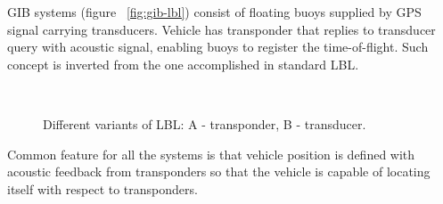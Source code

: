 GIB systems (figure ~\ref{fig:gib-lbl}) consist of floating buoys supplied by GPS signal carrying transducers. Vehicle has transponder that replies to transducer query with acoustic signal, enabling buoys to register the time-of-flight. Such concept is inverted from the one accomplished in standard LBL.    
\begin{figure}%
  \begin{center}
       \\
  \end{center}
  \caption{Different variants of LBL: A - transponder, B - transducer.}
  \label{fig:lbl}
\end{figure}
Common feature for all the systems is that vehicle position is defined with acoustic feedback from transponders so that the vehicle is capable of locating itself with respect to transponders.

